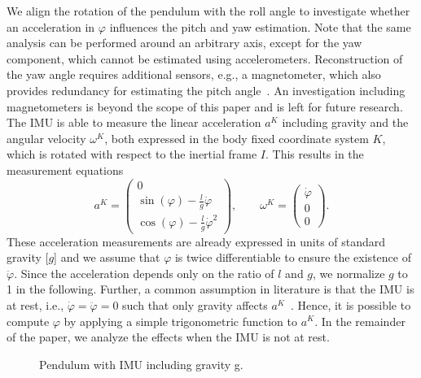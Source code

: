 We align the rotation of the pendulum with the roll angle to investigate whether an acceleration in $\varphi$ influences the pitch and yaw estimation.
Note that the same analysis can be performed around an arbitrary axis, except for the yaw component, which cannot be estimated using accelerometers.
Reconstruction of the yaw angle requires additional sensors, e.g., a magnetometer, which also provides redundancy for estimating the pitch angle~\cite{Madgwick2011}. 
An investigation including magnetometers is beyond the scope of this paper and is left for future research.
The \ac{IMU} is able to measure the linear acceleration $a^K$ including gravity and the angular velocity $\omega^K$, both expressed in the body fixed coordinate system $K$, which is rotated with respect to the inertial frame $I$. 
This results in the measurement equations
\begin{equation}
	a^K = \begin{pmatrix}
		0 \\
		\sin(\varphi) - \frac{l}{g}\ddot{\varphi} \\
		\cos(\varphi) - \frac{l}{g}\dot{\varphi}^2
	\end{pmatrix} 
	,\qquad 
	\omega^K = \begin{pmatrix}
		\dot{\varphi}\\ 
		0 \\
		0
	\end{pmatrix}.
\end{equation}
These acceleration measurements are already expressed in units of standard gravity [$g$] and we assume that $\varphi$ is twice differentiable to ensure the existence of $\ddot{\varphi}$.
Since the acceleration depends only on the ratio of $l$ and $g$, we normalize $g$ to 1 in the following. 
Further, a common assumption in literature is that the \ac{IMU} is at rest, i.e., $\dot{\varphi}=\ddot{\varphi}=0$ such that only gravity affects $a^K$~\cite{Madgwick2011, Mahony2008, Ludwig2018a}.
Hence, it is possible to compute $\varphi$ by applying a simple trigonometric function to $a^K$.
In the remainder of the paper, we analyze the effects when the \ac{IMU} is not at rest.
\begin{figure}[tb]
	\centering
	
	\caption{Pendulum with \acs{IMU} including gravity g.}
	\label{IMG:Setup:Pendulum}
\end{figure}
